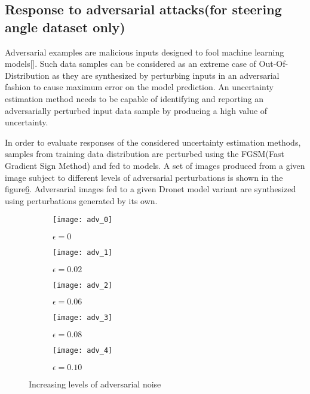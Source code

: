\subsection{Response to adversarial attacks(for steering angle dataset only)}\label{subsec_adv}
Adversarial examples are malicious inputs designed to fool machine learning models[\cite{kurakin2016adversarial}]. Such data samples can be considered as an extreme case of Out-Of-Distribution as they are synthesized by perturbing inputs in an adversarial fashion to cause maximum error on the model prediction. An uncertainty estimation method needs to be capable of identifying and reporting an adversarially perturbed input data sample by producing a high value of uncertainty. 

In order to evaluate responses of the considered uncertainty estimation methods, samples from training data distribution are perturbed using the FGSM(Fast Gradient Sign Method)\cite{goodfellow2015explaining} and fed to models. A set of images produced from a given image subject to different levels of adversarial perturbations is shown in the figure\ref{fig_adv_example}. Adversarial images fed to a given Dronet model variant are synthesized using perturbations generated by its own.  

\begin{figure}[H]
	\centering
	\begin{subfigure}[b]{0.19\textwidth}
		\centering
		\texttt{[image: adv\_0]}
		\caption{$\epsilon=0$}
		\label{fig:y equals x}
	\end{subfigure}
	\hfill
	\begin{subfigure}[b]{0.19\textwidth}
		\centering
		\texttt{[image: adv\_1]}
		\caption{$\epsilon=0.02$}
		\label{fig:three sin x}
	\end{subfigure}
	\hfill
	\begin{subfigure}[b]{0.19\textwidth}
		\centering
		\texttt{[image: adv\_2]}
		\caption{$\epsilon=0.06$}
		\label{fig:five over x}
	\end{subfigure}
	\hfill
	\begin{subfigure}[b]{0.19\textwidth}
		\centering
		\texttt{[image: adv\_3]}
		\caption{$\epsilon=0.08$}
		\label{fig:five over x}
	\end{subfigure}
	\hfill
	\begin{subfigure}[b]{0.19\textwidth}
		\centering
		\texttt{[image: adv\_4]}
		\caption{$\epsilon=0.10$}
		\label{fig:five over x}
	\end{subfigure}
	\caption{Increasing levels of adversarial noise}
	\label{fig_adv_example}
\end{figure}

